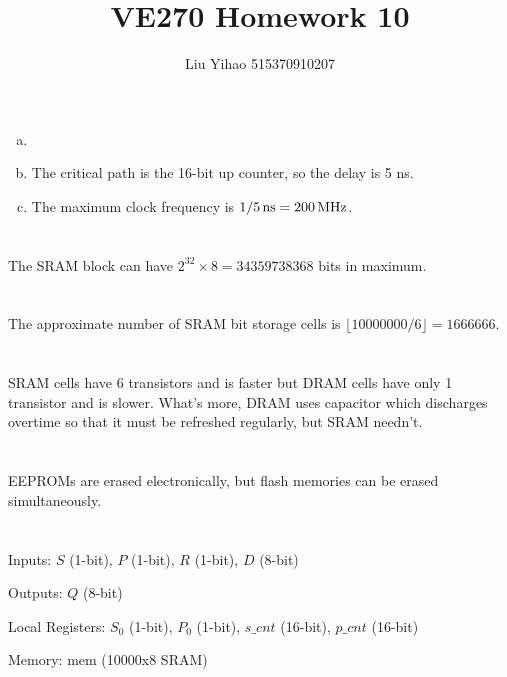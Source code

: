 \documentclass{article}
\title{VE270 Homework 10}
\author{Liu Yihao 515370910207}
\date{}
\newcommand{\unit}[1]{{\rm\,#1}}
\begin{document}
\maketitle

\section{}
\begin{enumerate}[(a)]
\item

\item
The critical path is the 16-bit up counter, so the delay is 5 ns.
\item
The maximum clock frequency is $1/5\unit{ns}=200\unit{MHz}$.
\end{enumerate}

\section{}
The SRAM block can have $2^{32}\times8=34359738368$ bits in maximum.

\section{}
The approximate number of SRAM bit storage cells is $\lfloor 10000000/6 \rfloor=1666666$.

\section{}
SRAM cells have 6 transistors and is faster but DRAM cells have only 1 transistor and is slower. What's more, DRAM uses capacitor which discharges overtime so that it must be refreshed regularly, but SRAM needn't.

\section{}
EEPROMs are erased electronically, but flash memories can be erased simultaneously.

\section{}
Inputs: $S$ (1-bit), $P$ (1-bit), $R$ (1-bit), $D$ (8-bit)

Outputs: $Q$ (8-bit)

Local Registers: $S_0$ (1-bit), $P_0$ (1-bit), $s\_cnt$ (16-bit), $p\_cnt$ (16-bit)

Memory: mem (10000x8 SRAM)
\end{document}
